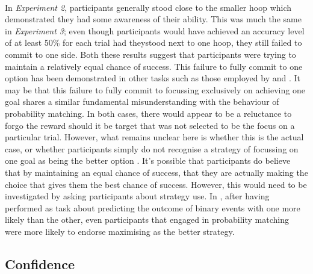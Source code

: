 \documentclass[12pt]{article}
\begin{document}
\paragraph{} In \textit{Experiment 2}, participants generally stood close to the smaller hoop which demonstrated they had some awareness of their ability. This was much the same in \textit{Experiment 3}; even though participants would have achieved an accuracy level of at least 50\% for each trial had theystood next to one hoop, they still failed to commit to one side. Both these results suggest that participants were trying to maintain a relatively equal chance of success. This failure to fully commit to one option has been demonstrated in other tasks such as those employed by \cite{CHAPMAN2010168} and \cite{Hudson2007probmove}. It may be that this failure to fully commit to focussing exclusively on achieving one goal shares a similar fundamental misunderstanding with the behaviour of probability matching. In both cases, there would appear to be a reluctance to forgo the reward should it be target that was not selected to be the focus on a particular trial. However, what remains unclear here is whether this is the actual case, or whether participants simply do not recognise a strategy of focussing on one goal as being the better option \citep{kahneman1982judgement}. It's possible that participants do believe that by maintaining an equal chance of success, that they are actually making the choice that gives them the best chance of success. However, this would need to be investigated by asking participants about strategy use. In \cite{Koehler2010}, after having performed as task about predicting the outcome of binary events with one more likely than the other, even participants that engaged in probability matching were more likely to endorse maximising as the better strategy. 

\subsection*{Confidence}
\end{document}
